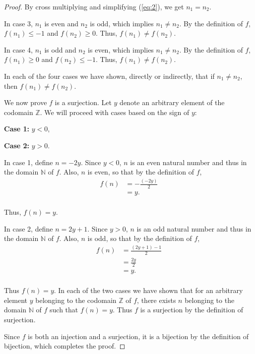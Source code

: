 \documentclass[11 pt]{article}
\newcommand{\newpar}{\vspace{.15in}\noindent}
\begin{document}
\begin{proof}
\newpar By cross multiplying and simplifying (\ref{eq:2}), we get $n_1=n_2$.

\newpar
In case 3, $n_1$ is even and $n_2$ is odd, which implies $n_1\not=n_2$. By the definition of $f$, $f(n_1)\le -1$ and $f(n_2)\ge 0$. Thus, $f(n_1)\not=f(n_2)$.

\newpar
In case 4, $n_1$ is odd and $n_2$ is even, which implies $n_1\not=n_2$. By the definition of $f$, $f(n_1)\ge 0$ and $f(n_2)\le -1$. Thus, $f(n_1)\not=f(n_2)$.


\newpar 
In each of the four cases we have shown, directly or indirectly, that if $n_1\not=n_2$, then $f(n_1)\not=f(n_2)$.

\newpar 
We now prove $f$ is a surjection. Let $y$ denote an arbitrary element of the codomain $\mathbb{Z}$. We will proceed with cases based on the sign of $y$:

\textbf{Case 1:} $y<0$,

\textbf{Case 2:} $y>0$.

\newpar 
In case 1, define $n=-2y$. Since $y<0$, $n$ is an even natural number and thus in the domain $\mathbb{N}$ of $f$. Also, $n$ is even, so that by the definition of $f$,
\begin{align*}
f(n)&=-\frac{(-2y)}{2} \\
&=y. \\
\end{align*}

\newpar 
Thus, $f(n)=y$.

\newpar 
In case 2, define $n=2y+1$. Since $y>0$, $n$ is an odd natural number and thus in the domain $\mathbb{N}$ of $f$. Also, $n$ is odd, so that by the definition of $f$,
\begin{align*}
f(n)&=\frac{(2y+1)-1}{2} \\
&=\frac{2y}{2} \\
&=y. \\
\end{align*}

\newpar 
Thus $f(n)=y$. In each of the two cases we have shown that for an arbitrary element $y$ belonging to the codomain $\mathbb{Z}$ of $f$, there exists $n$ belonging to the domain $\mathbb{N}$ of $f$ such that $f(n)=y$. Thus $f$ is a surjection by the definition of surjection.

\newpar Since $f$ is both an injection and a surjection, it is a bijection by the definition of bijection, which completes the proof.
\end{proof}
\end{document}
